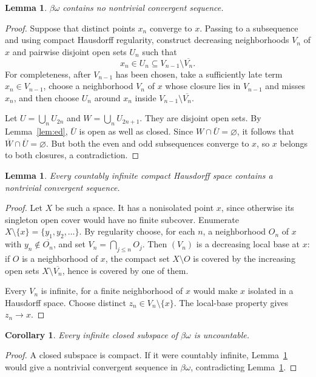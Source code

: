 \documentclass[11pt]{article}
\newtheorem{lemma}[theorem]{Lemma}
\newtheorem{corollary}[theorem]{Corollary}
\theoremstyle{definition}
\theoremstyle{remark}
\newcommand{\bN}{\beta\omega}
\begin{document}
\begin{lemma}\label{lem:noseq}
$\bN$ contains no nontrivial convergent sequence.
\end{lemma}
\begin{proof}
Suppose that distinct points $x_n$ converge to $x$.  Passing to a subsequence
and using compact Hausdorff regularity, construct decreasing neighborhoods
$V_n$ of $x$ and pairwise disjoint open sets $U_n$ such that
\[
  x_n\in U_n\subseteq V_{n-1}\setminus\overline{V_n}.
\]
For completeness, after $V_{n-1}$ has been chosen, take a sufficiently late
term $x_n\in V_{n-1}$, choose a neighborhood $V_n$ of $x$ whose closure lies
in $V_{n-1}$ and misses $x_n$, and then choose $U_n$ around $x_n$ inside
$V_{n-1}\setminus\overline{V_n}$.

Let $U=\bigcup_n U_{2n}$ and $W=\bigcup_n U_{2n+1}$.  They are disjoint open
sets.  By Lemma~\ref{lem:ed}, $\overline U$ is open as well as closed.  Since
$W\cap\overline U=\varnothing$, it follows that
$\overline W\cap\overline U=\varnothing$.  But both the even and odd
subsequences converge to $x$, so $x$ belongs to both closures, a contradiction.
\end{proof}

\begin{lemma}\label{lem:countcompact}
Every countably infinite compact Hausdorff space contains a nontrivial
convergent sequence.
\end{lemma}
\begin{proof}
Let $X$ be such a space.  It has a nonisolated point $x$, since otherwise its
singleton open cover would have no finite subcover.  Enumerate
$X\setminus\{x\}=\{y_1,y_2,\ldots\}$.  By regularity choose, for each $n$, a
neighborhood $O_n$ of $x$ with $y_n\notin\overline{O_n}$, and set
$V_n=\bigcap_{j\le n}O_j$.  Then $(V_n)$ is a decreasing local base at $x$:
if $O$ is a neighborhood of $x$, the compact set $X\setminus O$ is covered by
the increasing open sets $X\setminus\overline{V_n}$, hence is covered by one
of them.

Every $V_n$ is infinite, for a finite neighborhood of $x$ would make $x$
isolated in a Hausdorff space.  Choose distinct $z_n\in V_n\setminus\{x\}$.
The local-base property gives $z_n\to x$.
\end{proof}

\begin{corollary}\label{cor:uncountable}
Every infinite closed subspace of $\bN$ is uncountable.
\end{corollary}
\begin{proof}
A closed subspace is compact.  If it were countably infinite,
Lemma~\ref{lem:countcompact} would give a nontrivial convergent sequence in
$\bN$, contradicting Lemma~\ref{lem:noseq}.
\end{proof}
\end{document}
